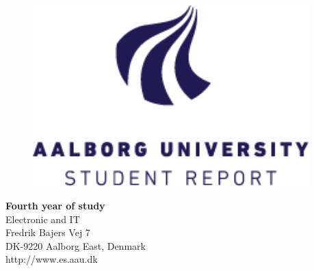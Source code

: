 {}
\thispagestyle{empty}

\begin{minipage}[t]{0.48\textwidth}
\vspace*{-25pt}			%

\begin{figure}[H] 
\includegraphics[width=0.95\textwidth]{report/introduction/aau_logo1}
\end{figure} 
\end{minipage}
\hfill
\begin{minipage}[t]{0.48\textwidth}
{\small 
\textbf{Fourth year of study}  \\
Electronic and IT \\
Fredrik Bajers Vej 7 \\
DK-9220 Aalborg East, Denmark\\
http://www.es.aau.dk}
\end{minipage}


\vspace*{1cm}

